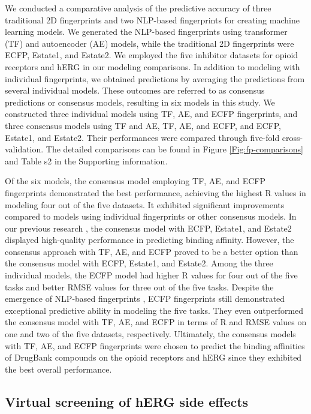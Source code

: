 \documentclass[10pt]{article}
\begin{document}
		We conducted a comparative analysis of the predictive accuracy of three traditional 2D fingerprints and two NLP-based fingerprints for creating machine learning models. We generated the NLP-based fingerprints using transformer (TF) and autoencoder (AE) models, while the traditional 2D fingerprints were ECFP, Estate1, and Estate2. We employed the five inhibitor datasets for opioid receptors and hERG in our modeling comparisons. In addition to modeling with individual fingerprints, we obtained predictions by averaging the predictions from several individual models. These outcomes are referred to as consensus predictions or consensus models, resulting in six models in this study. We constructed three individual models using TF, AE, and ECFP fingerprints, and three consensus models using TF and AE, TF, AE, and ECFP, and ECFP, Estate1, and Estate2. Their performances were compared through five-fold cross-validation. The detailed comparisons can be found in Figure \ref{Fig:fp-comparisons} and Table s2 in the Supporting information.
		
		Of the six models, the consensus model employing TF, AE, and ECFP fingerprints demonstrated the best performance, achieving the highest R values in modeling four out of the five datasets. It exhibited significant improvements compared to models using individual fingerprints or other consensus models. In our previous research \cite{gao20202d}, the consensus model with ECFP, Estate1, and Estate2 displayed high-quality performance in predicting binding affinity. However, the consensus approach with TF, AE, and ECFP proved to be a better option than the consensus model with ECFP, Estate1, and Estate2. Among the three individual models, the ECFP model had higher R values for four out of the five tasks and better RMSE values for three out of the five tasks. Despite the emergence of NLP-based fingerprints \cite{chen2021extracting, winter2019learning}, ECFP fingerprints still demonstrated exceptional predictive ability in modeling the five tasks. They even outperformed the consensus model with TF, AE, and ECFP in terms of R and RMSE values on one and two of the five datasets, respectively. Ultimately, the consensus models with TF, AE, and ECFP fingerprints were chosen to predict the binding affinities of DrugBank compounds on the opioid receptors and hERG since they exhibited the best overall performance.
		
		
		\subsection{Virtual screening of hERG side effects}
		
\end{document}
